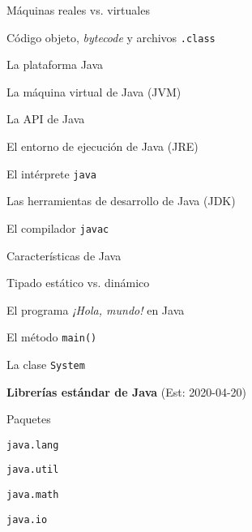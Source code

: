 \begin{longenum}
\begin{longenum}
\begin{longenum}
            \item Máquinas reales vs. virtuales
            \item Código objeto, \textit{bytecode} y archivos \texttt{.class}
            \item La plataforma Java
            \begin{longenum}
                \item La máquina virtual de Java (JVM)
                \item La API de Java
            \end{longenum}
            \item El entorno de ejecución de Java (JRE)
            \begin{longenum}
                \item El intérprete \texttt{java}
            \end{longenum}
            \item Las herramientas de desarrollo de Java (JDK)
            \begin{longenum}
                \item El compilador \texttt{javac}
            \end{longenum}
        \end{longenum}
        \item Características de Java
        \item Tipado estático vs. dinámico
        \item El programa \textit{¡Hola, mundo!} en Java
        \begin{longenum}
            \item El método \texttt{main()}
            \item La clase \texttt{System}
        \end{longenum}
    \end{longenum}
    \item \textbf{Librerías estándar de Java}  (Est: 2020-04-20)
    \begin{longenum}
        \item Paquetes
        \item \texttt{java.lang}
        \item \texttt{java.util}
        \item \texttt{java.math}
        \item \texttt{java.io}
    \end{longenum}
\end{longenum}

